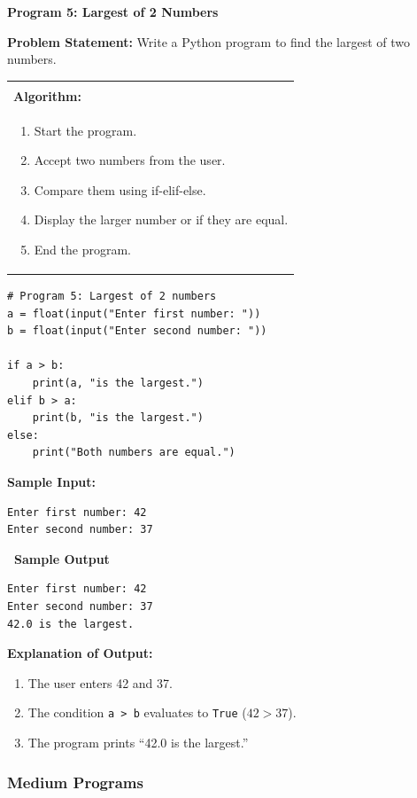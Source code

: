 \documentclass[12pt,a4paper]{article}
\makeatletter
\newcommand{\outhead}{\noindent\colorbox{cmrgreen!25}%
  {\textbf{\small\color{cmrdark}~Sample Output~}}\par\vspace{-1pt}}
\newenvironment{algobox}{%
  \par\vspace{4pt}%
  \noindent\begin{tabular}{@{}p{\linewidth}@{}}%
  \hline\\[-8pt]%
  \textbf{\color{blue!60!black}\small Algorithm:}\\[2pt]%
}{%
  \\[-4pt]\hline%
  \end{tabular}\par\vspace{4pt}%
}
\makeatother
\begin{document}
\vspace{0.5cm}

\textbf{Program 5: Largest of 2 Numbers}

\textbf{Problem Statement:}
Write a Python program to find the largest of two numbers.

\begin{algobox}
\begin{enumerate}[label=Step \arabic*:]
  \item Start the program.
  \item Accept two numbers from the user.
  \item Compare them using if-elif-else.
  \item Display the larger number or if they are equal.
  \item End the program.
\end{enumerate}
\end{algobox}

\begin{lstlisting}
# Program 5: Largest of 2 numbers
a = float(input("Enter first number: "))
b = float(input("Enter second number: "))

if a > b:
    print(a, "is the largest.")
elif b > a:
    print(b, "is the largest.")
else:
    print("Both numbers are equal.")
\end{lstlisting}

\textbf{Sample Input:}
\begin{verbatim}
Enter first number: 42
Enter second number: 37
\end{verbatim}

\outhead
\begin{lstlisting}[style=outputstyle]
Enter first number: 42
Enter second number: 37
42.0 is the largest.
\end{lstlisting}

\textbf{Explanation of Output:}
\begin{enumerate}
  \item The user enters 42 and 37.
  \item The condition \texttt{a > b} evaluates to \texttt{True} ($42 > 37$).
  \item The program prints ``42.0 is the largest.''
\end{enumerate}

\subsubsection{Medium Programs}
\end{document}

